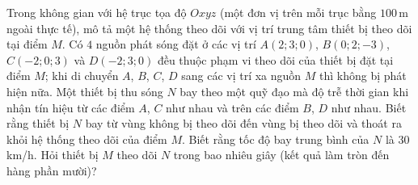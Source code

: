 \begin{bt}%
	Trong không gian với hệ trục tọa độ $Oxyz$ (một đơn vị  trên mỗi trục bằng $100$\,m ngoài thực tế), mô tả một hệ thống theo dõi với vị trí trung tâm thiết bị theo dõi tại điểm $M$. Có $4$ nguồn phát sóng đặt ở các vị trí $A(2;3;0)$, $B(0;2;-3)$, $C(-2;0;3)$ và $D(-2;3;0)$ đều thuộc phạm vi theo dõi của thiết bị đặt tại điểm $M$; khi di chuyển $A$, $B$, $C$, $D$ sang các vị trí xa nguồn $M$ thì không bị phát hiện nữa. Một thiết bị thu sóng $N$ bay theo một quỹ đạo mà độ trễ thời gian khi nhận tín hiệu từ các điểm $A$, $C$ như nhau và trên các điểm $B$, $D$ như nhau. Biết rằng thiết bị $N$ bay từ vùng không bị theo dõi đến vùng bị theo dõi và thoát ra khỏi hệ thống theo dõi của điểm $M$. Biết rằng tốc độ bay trung bình của $N$ là $30$\,km/h. Hỏi thiết bị $M$ theo dõi $N$ trong bao nhiêu giây (kết quả làm tròn đến hàng phần mười)?
\end{bt}
